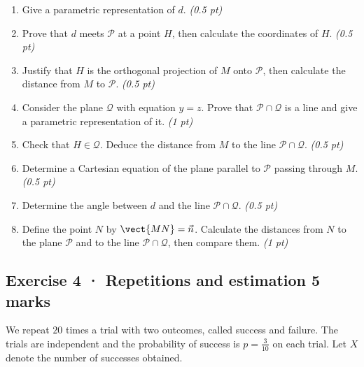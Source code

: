 \begin{enumerate}

\item Give a parametric representation of $d$. \hfill\textit{(0.5 pt)}

\item Prove that $d$ meets $\mathcal P$ at a point $H$, then calculate the coordinates of $H$. \hfill\textit{(0.5 pt)}

\item Justify that $H$ is the orthogonal projection of $M$ onto $\mathcal P$, then calculate the distance from $M$ to $\mathcal P$. \hfill\textit{(0.5 pt)}

\item Consider the plane $\mathcal Q$ with equation $y=z$. Prove that $\mathcal P\cap\mathcal Q$ is a line and give a parametric representation of it. \hfill\textit{(1 pt)}

\item Check that $H\in\mathcal Q$. Deduce the distance from $M$ to the line $\mathcal P\cap\mathcal Q$. \hfill\textit{(0.5 pt)}

\item Determine a Cartesian equation of the plane parallel to $\mathcal P$ passing through $M$. \hfill\textit{(0.5 pt)}

\item Determine the angle between $d$ and the line $\mathcal P\cap\mathcal Q$. \hfill\textit{(0.5 pt)}

\item Define the point $N$ by $\vect{MN}=\vec n$. Calculate the distances from $N$ to the plane $\mathcal P$ and to the line $\mathcal P\cap\mathcal Q$, then compare them. \hfill\textit{(1 pt)}

\end{enumerate}

\subsection*{Exercise 4 · Repetitions and estimation \hfill 5 marks}We repeat $20$ times a trial with two outcomes, called success and failure. The trials are independent and the probability of success is $p=\frac{3}{10}$ on each trial. Let $X$ denote the number of successes obtained.

